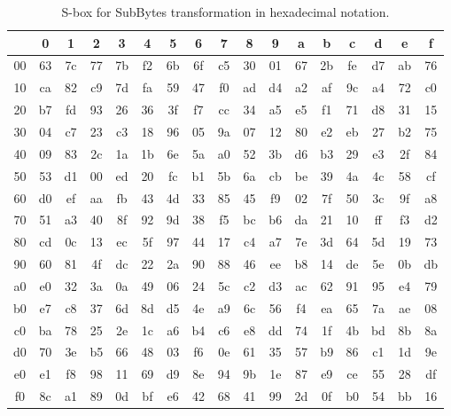 \begin{table}
\label{sbox}
\begin{center}
\begin{tabular}{|c|cccccccccccccccc|}\hline%
      &  0 &  1 &  2 &  3 &  4 &  5 &  6 &  7 &  8 &  9 &  a &  b &  c &  d &  e &  f \\\hline
   00 & 63 & 7c & 77 & 7b & f2 & 6b & 6f & c5 & 30 & 01 & 67 & 2b & fe & d7 & ab & 76 \\ 
   10 & ca & 82 & c9 & 7d & fa & 59 & 47 & f0 & ad & d4 & a2 & af & 9c & a4 & 72 & c0 \\ 
   20 & b7 & fd & 93 & 26 & 36 & 3f & f7 & cc & 34 & a5 & e5 & f1 & 71 & d8 & 31 & 15 \\ 
   30 & 04 & c7 & 23 & c3 & 18 & 96 & 05 & 9a & 07 & 12 & 80 & e2 & eb & 27 & b2 & 75 \\ 
   40 & 09 & 83 & 2c & 1a & 1b & 6e & 5a & a0 & 52 & 3b & d6 & b3 & 29 & e3 & 2f & 84 \\ 
   50 & 53 & d1 & 00 & ed & 20 & fc & b1 & 5b & 6a & cb & be & 39 & 4a & 4c & 58 & cf \\ 
   60 & d0 & ef & aa & fb & 43 & 4d & 33 & 85 & 45 & f9 & 02 & 7f & 50 & 3c & 9f & a8 \\ 
   70 & 51 & a3 & 40 & 8f & 92 & 9d & 38 & f5 & bc & b6 & da & 21 & 10 & ff & f3 & d2 \\ 
   80 & cd & 0c & 13 & ec & 5f & 97 & 44 & 17 & c4 & a7 & 7e & 3d & 64 & 5d & 19 & 73 \\ 
   90 & 60 & 81 & 4f & dc & 22 & 2a & 90 & 88 & 46 & ee & b8 & 14 & de & 5e & 0b & db \\ 
   a0 & e0 & 32 & 3a & 0a & 49 & 06 & 24 & 5c & c2 & d3 & ac & 62 & 91 & 95 & e4 & 79 \\ 
   b0 & e7 & c8 & 37 & 6d & 8d & d5 & 4e & a9 & 6c & 56 & f4 & ea & 65 & 7a & ae & 08 \\ 
   c0 & ba & 78 & 25 & 2e & 1c & a6 & b4 & c6 & e8 & dd & 74 & 1f & 4b & bd & 8b & 8a \\ 
   d0 & 70 & 3e & b5 & 66 & 48 & 03 & f6 & 0e & 61 & 35 & 57 & b9 & 86 & c1 & 1d & 9e \\ 
   e0 & e1 & f8 & 98 & 11 & 69 & d9 & 8e & 94 & 9b & 1e & 87 & e9 & ce & 55 & 28 & df \\ 
   f0 & 8c & a1 & 89 & 0d & bf & e6 & 42 & 68 & 41 & 99 & 2d & 0f & b0 & 54 & bb & 16 \\ 
\hline
\end{tabular}
\end{center}
\caption{S-box for SubBytes transformation in hexadecimal notation.}
\end{table}

